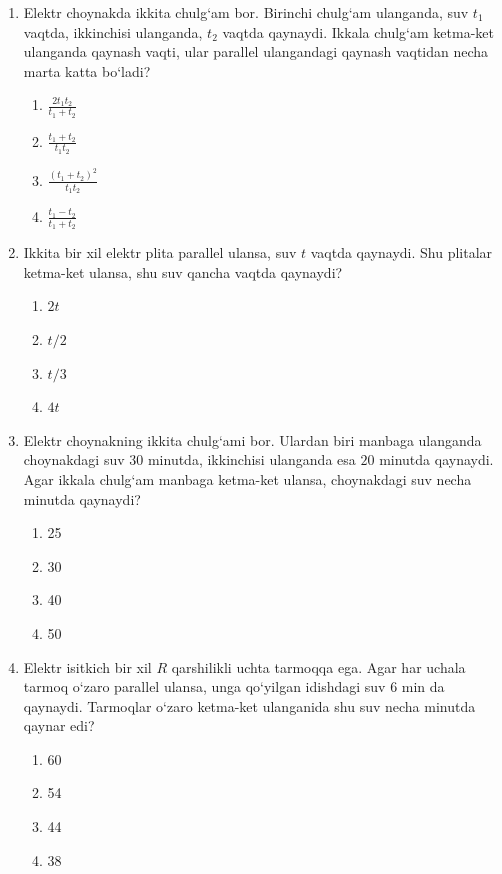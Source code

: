\begin{enumerate}
\item Elektr choynakda ikkita chulg‘am bor. Birinchi chulg‘am ulanganda, suv $t_1$ vaqtda, ikkinchisi ulanganda, $t_2$ vaqtda qaynaydi. Ikkala chulg‘am ketma-ket ulanganda qaynash vaqti, ular parallel ulangandagi qaynash vaqtidan necha marta katta bo‘ladi?
\begin{enumerate}[label=\Alph*)]
\item $\frac{2t_1 t_2}{t_1+t_2}$
\item $\frac{t_1+t_2}{t_1 t_2}$
\item $\frac{(t_1+t_2)^2}{t_1 t_2}$
\item $\frac{t_1-t_2}{t_1+t_2}$
\end{enumerate}

\item Ikkita bir xil elektr plita parallel ulansa, suv $t$ vaqtda qaynaydi. Shu plitalar ketma-ket ulansa, shu suv qancha vaqtda qaynaydi?
\begin{enumerate}[label=\Alph*)]
\item $2t$
\item $t/2$
\item $t/3$
\item $4t$
\end{enumerate}


\item Elektr choynakning ikkita chulg‘ami bor. Ulardan biri manbaga ulanganda choynakdagi suv $30$ minutda, ikkinchisi ulanganda esa $20$ minutda qaynaydi. Agar ikkala chulg‘am manbaga ketma-ket ulansa, choynakdagi suv necha minutda qaynaydi?
\begin{enumerate}[label=\Alph*)]
\item 25
\item 30
\item 40
\item 50
\end{enumerate}

\item Elektr isitkich bir xil $R$ qarshilikli uchta tarmoqqa ega. Agar har uchala tarmoq o‘zaro parallel ulansa, unga qo‘yilgan idishdagi suv $6$ min da qaynaydi. Tarmoqlar o‘zaro ketma-ket ulanganida shu suv necha minutda qaynar edi?
\begin{enumerate}[label=\Alph*)]
\item 60
\item 54
\item 44
\item 38
\end{enumerate}


\end{enumerate}
